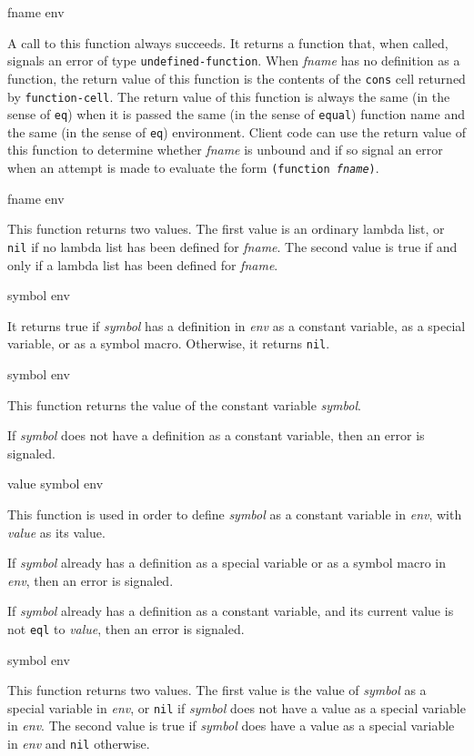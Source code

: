  {fname env}

A call to this function always succeeds.  It returns a function
that, when called, signals an error of type \texttt{undefined-function}.
When \textit{fname} has no definition as a function, the return
value of this function is the contents of the \texttt{cons} cell returned
by \texttt{function-cell}.  The return value of this function is always the
same (in the sense of \texttt{eq}) when it is passed the same (in the sense
of \texttt{equal}) function name and the same (in the sense of \texttt{eq})
environment.  Client code can use the return value of this
function to determine whether \textit{fname} is unbound and if so
signal an error when an attempt is made to evaluate the form
\texttt{(function \textrm{\textit{fname}})}.

 {fname env}

This function returns two values.  The first value is an ordinary
lambda list, or \texttt{nil} if no lambda list has been defined for
\textit{fname}.  The second value is true if and only if a lambda
list has been defined for \textit{fname}.

 {symbol env}

It returns true if \textit{symbol} has a definition in \textit{env} as a
constant variable, as a special variable, or as a symbol macro.
Otherwise, it returns \texttt{nil}.

 {symbol env}

This function returns the value of the constant
variable \textit{symbol}.

If \textit{symbol} does not have a definition as a constant variable,
then an error is signaled.

 {value symbol env}

This function is used in order to define \textit{symbol} as a constant
variable in \textit{env}, with \textit{value} as its value.

If \textit{symbol} already has a definition as a special variable or as a
symbol macro in \textit{env}, then an error is signaled.

If \textit{symbol} already has a definition as a constant variable, and its
current value is not \texttt{eql} to \textit{value}, then an error is signaled.

 {symbol env}

This function returns two values.  The first value is the value of
\textit{symbol} as a special variable in \textit{env}, or \texttt{nil} if \textit{symbol}
does not have a value as a special variable in \textit{env}.  The
second value is true if \textit{symbol} does have a value as a special
variable in \textit{env} and \texttt{nil} otherwise.

